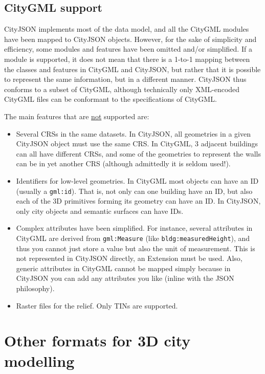 \subsection{CityGML support}

CityJSON implements most of the data model, and all the CityGML modules have been mapped to CityJSON objects. 
However, for the sake of simplicity and efficiency, some modules and features have been omitted and/or simplified. 
If a module is supported, it does not mean that there is a 1-to-1 mapping between the classes and features in CityGML and CityJSON, but rather that it is possible to represent the same information, but in a different manner. 
CityJSON thus conforms to a subset of CityGML, although technically only XML-encoded CityGML files can be conformant to the specifications of CityGML\@.

%

The main features that are \underline{not} supported are:
\begin{itemize}
  \item Several CRSs in the same datasets. In CityJSON, all geometries in a given CityJSON object must use the same CRS\@. In CityGML, 3 adjacent buildings can all have different CRSs, and some of the geometries to represent the walls can be in yet another CRS (although admittedly it is seldom used!).
  \item Identifiers for low-level geometries. In CityGML most objects can have an ID (usually a \texttt{gml:id}). That is, not only can one building have an ID, but also each of the 3D primitives forming its geometry can have an ID\@. In CityJSON, only city objects and semantic surfaces can have IDs.
  \item Complex attributes have been simplified. For instance, several attributes in CityGML are derived from \texttt{gml:Measure} (like \texttt{bldg:mea\-su\-red\-Height}), and thus you cannot just store a value but also the unit of measurement. This is not represented in CityJSON directly, an Extension must be used. Also, generic attributes in CityGML cannot be mapped simply because in CityJSON you can add any attributes you like (inline with the JSON philosophy).
  \item Raster files for the relief. Only TINs are supported.
\end{itemize}



%
\section[Other formats]{Other formats for 3D city modelling}

